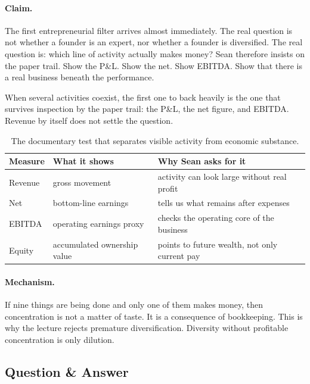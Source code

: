 \paragraph{Claim.}
The first entrepreneurial filter arrives almost immediately. The real question is not whether a founder is an expert, nor whether a founder is diversified. The real question is: which line of activity actually makes money? Sean therefore insists on the paper trail. Show the P\&L. Show the net. Show EBITDA. Show that there is a real business beneath the performance.

\begin{definition}
When several activities coexist, the first one to back heavily is the one that survives inspection by the paper trail: the P\&L, the net figure, and EBITDA. Revenue by itself does not settle the question.
\end{definition}

\begin{table}[h]
\centering
\begin{tabular}{|l|l|l|}
\hline
Measure & What it shows & Why Sean asks for it \\
\hline
Revenue & gross movement & activity can look large without real profit \\
\hline
Net & bottom-line earnings & tells us what remains after expenses \\
\hline
EBITDA & operating earnings proxy & checks the operating core of the business \\
\hline
Equity & accumulated ownership value & points to future wealth, not only current pay \\
\hline
\end{tabular}
\caption{The documentary test that separates visible activity from economic substance.}
\end{table}

\paragraph{Mechanism.}
If nine things are being done and only one of them makes money, then concentration is not a matter of taste. It is a consequence of bookkeeping. This is why the lecture rejects premature diversification. Diversity without profitable concentration is only dilution.

\subsection{Question \& Answer}

